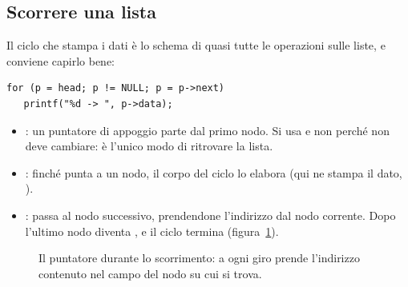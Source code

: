 \subsection{Scorrere una lista}

Il ciclo che stampa i dati è lo schema di quasi tutte le operazioni sulle
liste, e conviene capirlo bene:

\begin{lstlisting}[style=c]
for (p = head; p != NULL; p = p->next)
   printf("%d -> ", p->data);
\end{lstlisting}

\begin{itemize}
  \item {}: un puntatore di appoggio parte dal primo nodo. Si
        usa  e non  perché  non deve cambiare:
        è l'unico modo di ritrovare la lista.
  \item {}: finché  punta a un nodo, il corpo del ciclo
        lo elabora (qui ne stampa il dato, ).
  \item {}:  passa al nodo successivo, prendendone
        l'indirizzo dal nodo corrente. Dopo l'ultimo nodo  diventa
        , e il ciclo termina (figura~\ref{fig:scorri}).
\end{itemize}

\begin{figure}[H]
  \centering
  \caption{Il puntatore  durante lo scorrimento: a ogni giro prende
           l'indirizzo contenuto nel campo  del nodo su cui si
           trova.}
  \label{fig:scorri}
\end{figure}

